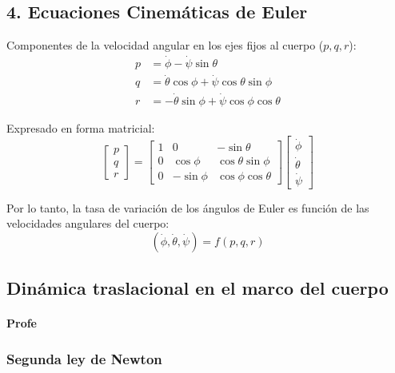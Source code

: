 \documentclass[11pt,a4paper]{article}
\begin{document}
\vspace{0.3cm}

\subsection*{4. Ecuaciones Cinemáticas de Euler}

Componentes de la velocidad angular en los ejes fijos al cuerpo ($p, q, r$):
\begin{align}
p &= \dot{\phi} - \dot{\psi}\sin\theta \\
q &= \dot{\theta}\cos\phi + \dot{\psi}\cos\theta\sin\phi \\
r &= -\dot{\theta}\sin\phi + \dot{\psi}\cos\phi\cos\theta
\end{align}

Expresado en forma matricial:
\begin{equation}
\begin{bmatrix}
p \\
q \\
r
\end{bmatrix}
=
\begin{bmatrix}
1 & 0 & -\sin\theta \\
0 & \cos\phi & \cos\theta\sin\phi \\
0 & -\sin\phi & \cos\phi\cos\theta
\end{bmatrix}
\begin{bmatrix}
\dot{\phi} \\
\dot{\theta} \\
\dot{\psi}
\end{bmatrix}
\end{equation}

Por lo tanto, la tasa de variación de los ángulos de Euler es función de las velocidades angulares del cuerpo:
\begin{equation}
(\dot{\phi}, \dot{\theta}, \dot{\psi}) = f (p, q, r)
\end{equation}



\subsection{Dinámica traslacional en el marco del cuerpo}
\paragraph{Profe}
\subsubsection{Segunda ley de Newton}
\end{document}
